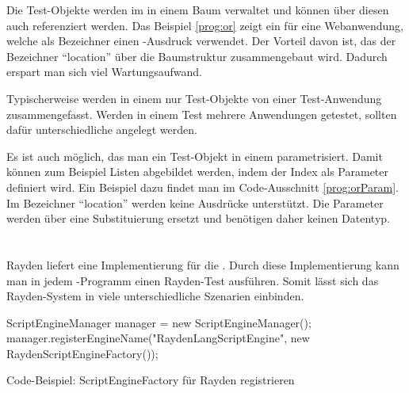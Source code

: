 \SuperPar
Die Test-Objekte werden im  in einem Baum verwaltet und können über diesen auch referenziert werden. Das Beispiel \ref{prog:or} zeigt ein  für eine Webanwendung, welche als Bezeichner einen -Ausdruck verwendet.  Der Vorteil davon ist, das der Bezeichner "`location"' über die Baumstruktur zusammengebaut wird. Dadurch erspart man sich viel Wartungsaufwand. 

\SuperPar
Typischerweise werden in einem  nur Test-Objekte von einer Test-Anwendung zusammengefasst. Werden in einem Test mehrere Anwendungen getestet, sollten dafür unterschiedliche  angelegt werden.

\begin{program}
\caption{}
\label{prog:orParam}
\end{program}

\SuperPar
Es ist auch möglich, das man ein Test-Objekt in einem  parametrisiert. Damit können zum Beispiel Listen abgebildet werden, indem der Index als Parameter definiert wird. Ein Beispiel dazu findet man im Code-Ausschnitt \ref{prog:orParam}. Im Bezeichner "`location"' werden keine Ausdrücke unterstützt. Die Parameter werden über eine Substituierung ersetzt und benötigen daher keinen Datentyp.



\section{}

Rayden liefert eine Implementierung für die . Durch diese Implementierung kann man in jedem -Programm einen Rayden-Test ausführen. Somit lässt sich das Rayden-System in viele unterschiedliche Szenarien einbinden. 

\begin{program}
\begin{JavaCode}
ScriptEngineManager manager = new ScriptEngineManager();
manager.registerEngineName("RaydenLangScriptEngine", new RaydenScriptEngineFactory());
\end{JavaCode}
\caption{Code-Beispiel: ScriptEngineFactory für Rayden registrieren}
\label{prog:registerFactory}
\end{program}

